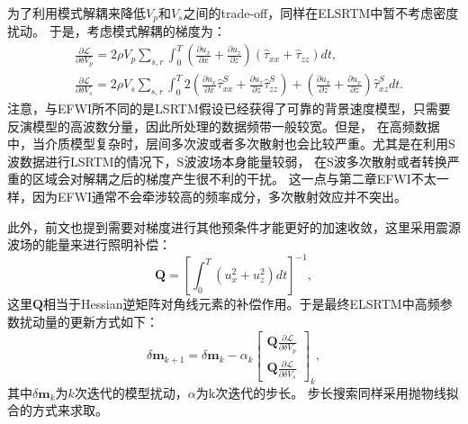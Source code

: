 为了利用模式解耦来降低$V_p$和$V_s$之间的trade-off，同样在ELSRTM中暂不考虑密度扰动。
于是，考虑模式解耦的梯度为：
\begin{equation}
\begin{split}
   & \frac{\partial\mathcal{L}}{\partial \delta V_p}=2\rho V_p\sum_{s,r}\int^T_{0}
	(\frac{\partial u_x}{\partial x}+\frac{\partial u_z}{\partial
	z})(\hat{\tau}_{xx}+\hat{\tau}_{zz})dt,\\
   & \frac{\partial\mathcal{L}}{\partial \delta V_s}=2\rho V_s\sum_{s,r}\int^T_{0}
	2(\frac{\partial u_x}{\partial x}\hat{\tau}^S_{xx}+\frac{\partial u_z}{\partial z}\hat{\tau}^S_{zz})+
	(\frac{\partial u_x}{\partial z}+\frac{\partial u_x}{\partial
	z})\hat{\tau}^S_{xz}dt.
    \label{eq:Gradient_Vel_LSRTM}
\end{split}
\end{equation}
注意，与EFWI所不同的是LSRTM假设已经获得了可靠的背景速度模型，只需要反演模型的高波数分量，因此所处理的数据频带一般较宽。但是，
在高频数据中，当介质模型复杂时，层间多次波或者多次散射也会比较严重。尤其是在利用S波数据进行LSRTM的情况下，S波波场本身能量较弱，
在S波多次散射或者转换严重的区域会对解耦之后的梯度产生很不利的干扰。
这一点与第二章EFWI不太一样，因为EFWI通常不会牵涉较高的频率成分，多次散射效应并不突出。

此外，前文也提到需要对梯度进行其他预条件才能更好的加速收敛，这里采用震源波场的能量来进行照明补偿：
\begin{equation}
	\mathbf{Q} =\left[\int^T_0(u^2_x+u^2_z)dt\right]^{-1},
    \label{eq:Gradient_Illumination_LSRTM}
\end{equation}
这里$\mathbf{Q}$相当于Hessian逆矩阵对角线元素的补偿作用。于是最终ELSRTM中高频参数扰动量的更新方式如下：
\begin{equation}
	\delta\mathbf{m}_{k+1}=\delta\mathbf{m}_{k}-\alpha_{k}
        \begin{bmatrix}\mathbf{Q}{\frac{\partial\mathcal{L}}{\partial \delta V_p}}\\
		\mathbf{Q}{\frac{\partial\mathcal{L}}{\partial \delta V_s}}\end{bmatrix}_{k},
        \label{eq:Gradientmethod_LSRTM}
\end{equation}
其中$\delta\mathbf{m}_{k}$为$k$次迭代的模型扰动，$\alpha$为k次迭代的步长。
步长搜索同样采用抛物线拟合的方式来求取。
